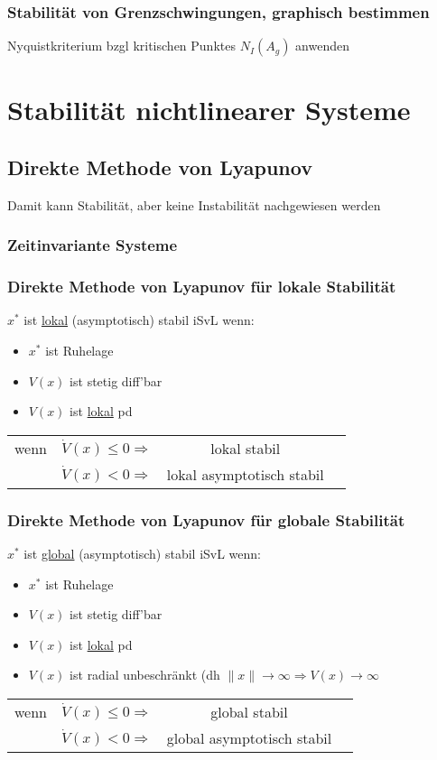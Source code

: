 \documentclass[6pt,a4paper,fleqn]{scrartcl}
\begin{document}
\begin{multicols*}{4}
\subsubsection*{Stabilität von Grenzschwingungen, graphisch bestimmen}

Nyquistkriterium bzgl kritischen Punktes $N_I(A_g)$ anwenden

\section{Stabilität nichtlinearer Systeme}

\subsection{Direkte Methode von Lyapunov}
Damit kann Stabilität, aber keine Instabilität nachgewiesen werden

\subsubsection*{Zeitinvariante Systeme}

\subsubsection*{Direkte Methode von Lyapunov für lokale Stabilität}

$x^*$ ist \underline{lokal} (asymptotisch) stabil iSvL wenn:
\begin{itemize}
  \item $x^*$ ist Ruhelage
  \item $V(x)$ ist stetig diff'bar
  \item $V(x)$ ist \underline{lokal} pd
\end{itemize}
\begin{tabular}{cccc}
  wenn  &$\dot{V}(x) \leq 0 \Rightarrow$& lokal stabil \\
   &$\dot{V}(x) < 0 \Rightarrow $& lokal asymptotisch stabil
\end{tabular}

\subsubsection*{Direkte Methode von Lyapunov für globale Stabilität}

$x^*$ ist \underline{global} (asymptotisch) stabil iSvL wenn:
\begin{itemize}
  \item $x^*$ ist Ruhelage
  \item $V(x)$ ist stetig diff'bar
  \item $V(x)$ ist \underline{lokal} pd
  \item $V(x)$ ist radial unbeschränkt (dh $\|x\| \rightarrow \infty \Rightarrow V(x) \rightarrow \infty$
\end{itemize}
\begin{tabular}{cccc}
  wenn  &$\dot{V}(x) \leq 0 \Rightarrow$& global stabil \\
   &$\dot{V}(x) < 0 \Rightarrow $& global asymptotisch stabil
\end{tabular}



\end{multicols*}
\end{document}
